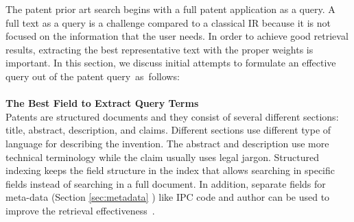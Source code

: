 The patent prior art search begins with a full patent application as a query. A full text as a query is a challenge compared to a classical IR because it is not focused on the information that the user needs. In order to achieve good retrieval results, extracting the best representative text with the proper weights is important. In this section, we discuss initial attempts to formulate an effective query out of the patent query~as~follows:
\\\\
\textbf{The Best Field to Extract Query Terms}
\ \\
Patents are structured documents and they consist of several different sections: title, abstract, description, and claims. Different sections use different type of language for describing the invention. The abstract and description use more technical terminology while the claim usually uses legal jargon. Structured indexing keeps the field structure in the index that allows searching in specific fields instead of searching in a full document. In addition, separate fields for meta-data (Section \ref{sec:metadata} ) like IPC code and author can be used to improve the retrieval effectiveness~\citep{magdy2010exploring}. 

